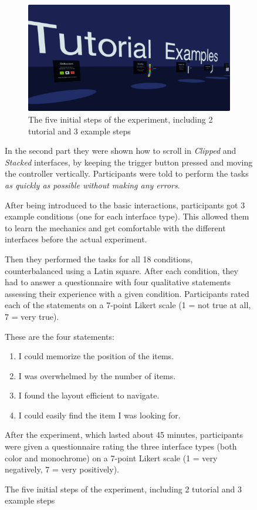 \documentclass{tufte-book} %
\begin{document}
\begin{figure}
\begin{figure}
  \includegraphics{tutorials.png}
  \caption{The five initial steps of the experiment, including 2 tutorial and 3 example steps}
  \label{fig:tutorials}
\end{figure}

In the second part they were shown how to scroll in \emph{Clipped} and \emph{Stacked} interfaces, by keeping the trigger button pressed and moving the controller vertically.
Participants were told to perform the tasks \emph{as quickly as possible without making any errors}.

After being introduced to the basic interactions, participants got 3 example conditions (one for each interface type). This allowed them to learn the mechanics and get comfortable with the different interfaces before the actual experiment.

Then they performed the tasks for all 18 conditions, counterbalanced using a Latin square. After each condition, they had to answer a questionnaire with four qualitative statements assessing their experience with a given condition. Participants rated each of the statements on a 7-point Likert scale (1 = not true at all, 7 = very true).

These are the four statements:

\begin{enumerate}[label=\arabic*. , wide=0.5em,  leftmargin=*]
  \item I could memorize the position of the items.
  \item I was overwhelmed by the number of items.
  \item I found the layout efficient to navigate.
  \item I could easily find the item I was looking for.
\end{enumerate}

After the experiment, which lasted about 45 minutes, participants were given a questionnaire rating the three interface types (both color and monochrome) on a 7-point Likert scale (1 = very negatively, 7 = very positively).


\end{figure}
\end{document}
